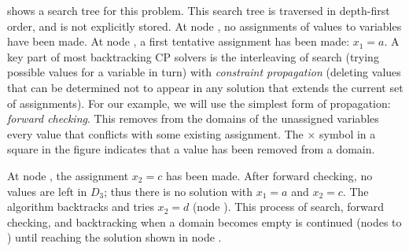  shows a search tree for this problem.
This search tree is traversed in depth-first order, and is not explicitly
stored.
At node ,
no assignments of values to variables have been made. At node , a first
tentative assignment has been made: $x_1=a$. A key part of most backtracking CP
solvers is the interleaving of search (trying possible values for a variable
in turn) with \emph{constraint propagation} (deleting values that can be
determined not to appear in any solution that extends the current set of
assignments). For our example, we will use the simplest form of propagation:
\emph{forward checking}. This removes from the domains of the unassigned variables
every value that conflicts with some existing assignment. The $\times$ symbol
in a square in the figure indicates that a value has been removed from a domain.

At node , the assignment $x_2=c$ has been made. After forward checking, no
values are left in $D_3$; thus there is no solution with $x_1=a$ and $x_2=c$.
The algorithm backtracks and tries $x_2=d$
(node ). This process of search, forward checking, and backtracking when
a domain becomes empty is continued (nodes  to ) until reaching the solution
shown in node .

